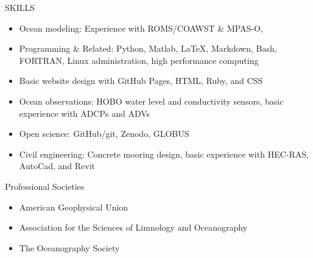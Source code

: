 \documentclass{resume} %
\begin{document}
\begin{rSection}{SKILLS}
\begin{itemize}
    \item Ocean modeling: Experience with ROMS/COAWST \& MPAS-O, 
    \item Programming \& Related: Python, Matlab, \LaTeX, Markdown, Bash, FORTRAN, Linux administration, high performance computing
    \item Basic website design with GitHub Pages, HTML, Ruby, and CSS
    \item Ocean observations: HOBO water level and conductivity sensors, basic experience with ADCPs and ADVs
    \item Open science: GitHub/git, Zenodo, GLOBUS
    \item Civil engineering: Concrete mooring design, basic experience with HEC-RAS, AutoCad, and Revit
\end{itemize}
\end{rSection}

\begin{rSection}{Professional Societies} \itemsep -3pt {}
\begin{itemize}
    \item American Geophysical Union
    \item Association for the Sciences of Limnology and Oceanography
    \item The Oceanography Society 
\end{itemize}
\end{rSection}


\end{document}
